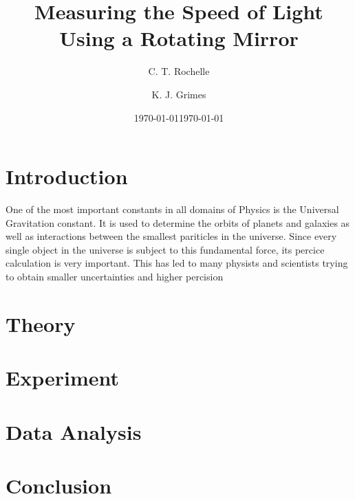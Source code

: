 \documentclass[aps,prl,10pt,twocolumn,floatfix]{revtex4-2}
\begin{document}


\title{Measuring the Speed of Light Using a Rotating Mirror}
\author{C. T. Rochelle}
\author{K. J. Grimes}
\date{\today}
\date{\today}

\maketitle

\section{Introduction}\label{Intro}
One of the most important constants in all domains of Physics is the Universal Gravitation constant. 
It is used to determine the orbits of planets and galaxies as well as interactions between the smallest pariticles in the universe.
Since every single object in the universe is subject to this fundamental force, its percice calculation is very important.
This has led to many physists and scientists trying to obtain smaller uncertainties and higher percision


\section{Theory}\label{Theory}


\section{Experiment}





\section{Data Analysis}


\section{Conclusion}


\end{document}
